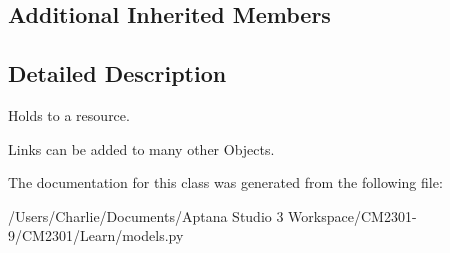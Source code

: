 \subsection*{Additional Inherited Members}


\subsection{Detailed Description}
Holds to a resource. 

Links can be added to many other Objects. 

The documentation for this class was generated from the following file\-:\begin{DoxyCompactItemize}
\item 
/\-Users/\-Charlie/\-Documents/\-Aptana Studio 3 Workspace/\-C\-M2301-\/9/\-C\-M2301/\-Learn/models.\-py\end{DoxyCompactItemize}
